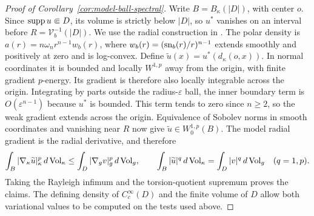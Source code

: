 \begin{proof}[Proof of Corollary~\ref{cor:model-ball-spectral}]
Write $B=B_\kappa(|D|)$, with center $o$. Since $\operatorname{supp} u\Subset D$, its volume is strictly
below $|D|$, so $u^*$ vanishes on an interval before
$R=\mathcal V_b^{-1}(|D|)$.
We use the radial construction in
\cite[proof of Theorem~1.6, Section~7.1]{NobiliViolo2025}.
The polar density is $a(r)=n\omega_n r^{n-1}w_b(r)$, where
$w_b(r)=(\operatorname{sn}_b(r)/r)^{n-1}$ extends smoothly and positively at zero
and is log-convex. Define
$\widetilde u(x)=u^*(d_\kappa(o,x))$. In normal coordinates it is bounded
and locally $W^{1,p}$ away from the origin, with finite gradient
$p$-energy. Its gradient is therefore also locally integrable across
the origin. Integrating by parts outside the radius-$\varepsilon$ ball,
the inner boundary term is $O(\varepsilon^{n-1})$ because $u^*$ is
bounded. This term tends to zero since $n\ge2$, so the weak gradient
extends across the origin. Equivalence of Sobolev norms in smooth
coordinates and vanishing near $R$ now give
$\widetilde u\in W^{1,p}_0(B)$.
The model radial gradient is the radial derivative, and therefore
\[
 \int_B|\nabla_\kappa\widetilde u|_\kappa^p\,d\operatorname{Vol}_\kappa
 \le\int_D|\nabla_gv|_g^p\,d\operatorname{Vol}_g,
 \qquad
 \int_B|\widetilde u|^q\,d\operatorname{Vol}_\kappa
 =\int_D|v|^q\,d\operatorname{Vol}_g\quad(q=1,p).
\]
Taking the Rayleigh infimum and the torsion-quotient supremum proves the
claims. The defining density of $C_c^\infty(D)$ and the finite volume of
$D$ allow both variational values to be computed on the tests used above.
\end{proof}
